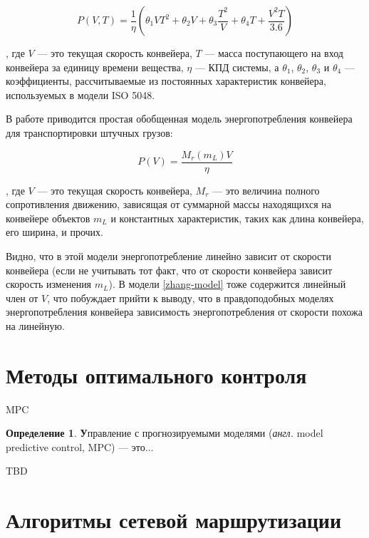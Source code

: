 \documentclass[specification,annotation,times]{itmo-student-thesis}
\theoremstyle{definition}
\newtheorem{definition-ru}{Определение}
\begin{document}
\begin{equation}\label{zhang-model}
  P(V, T) = \frac{1}{\eta} \left( \theta_1 VT^2 + \theta_2 V + \theta_3 \frac{T^2}{V}
  + \theta_4 T + \frac{V^2T}{3.6} \right)
\end{equation}

, где $V$ --- это текущая скорость конвейера, $T$ --- масса поступающего на вход
конвейера за единицу времени вещества, $\eta$ --- КПД системы, а $\theta_1$,
$\theta_2$, $\theta_3$ и $\theta_4$ --- коэффициенты, рассчитываемые из
постоянных характеристик конвейера, используемых в модели ISO 5048. 

В работе \cite{halepoto2016design} приводится простая обобщенная модель
энергопотребления конвейера для транспортировки штучных грузов:

\begin{equation}\label{zhang-model}
  P(V) = \frac{M_r(m_L)V}{\eta}
\end{equation}

, где $V$ --- это текущая скорость конвейера, $M_r$ --- это величина полного
сопротивления движению, зависящая от суммарной массы находящихся на конвейере
объектов $m_L$ и константных характеристик, таких как длина конвейера, его
ширина, и прочих.

Видно, что в этой модели энергопотребление линейно зависит от
скорости конвейера (если не учитывать тот факт, что от скорости конвейера
зависит скорость изменения $m_L$). В модели \ref{zhang-model} тоже содержится
линейный член от $V$, что побуждает прийти к выводу, что в правдоподобных
моделях энергопотребления конвейера зависимость энергопотребления от скорости
похожа на линейную.


\section{Методы оптимального контроля}

MPC \cite{luo2015energy}

\begin{definition-ru}
  \textbf Управление с прогнозируемыми моделями (\textit{англ.} model predictive
  control, MPC) --- это...
\end{definition-ru}

TBD

\section{Алгоритмы сетевой маршрутизации}\label{overview:networks}
\end{document}
